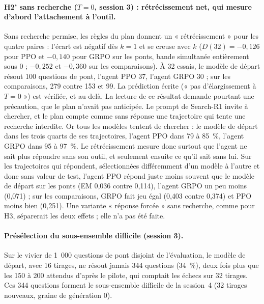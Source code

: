 \documentclass[11pt,a4paper]{article}
\begin{document}
\paragraph{H2' sans recherche ($T = 0$, session 3) : rétrécissement net, qui mesure d'abord l'attachement à l'outil.} Sans recherche permise, les règles du plan donnent un « rétrécissement » pour les quatre paires : l'écart est négatif dès $k = 1$ et se creuse avec $k$ ($D(32) = -0{,}126$ pour PPO et $-0{,}140$ pour GRPO sur les ponts, bande simultanée entièrement sous 0 ; $-0{,}252$ et $-0{,}360$ sur les comparaisons). À 32 essais, le modèle de départ résout 100 questions de pont, l'agent PPO 37, l'agent GRPO 30 ; sur les comparaisons, 279 contre 153 et 99. La prédiction écrite (« pas d'élargissement à $T = 0$ ») est vérifiée, et au-delà. La lecture de ce résultat demande pourtant une précaution, que le plan n'avait pas anticipée. Le prompt de Search-R1 invite à chercher, et le plan compte comme sans réponse une trajectoire qui tente une recherche interdite. Or tous les modèles tentent de chercher : le modèle de départ dans les trois quarts de ses trajectoires, l'agent PPO dans 79 à 85~\%, l'agent GRPO dans 95 à 97~\%. Le rétrécissement mesure donc surtout que l'agent ne sait plus répondre sans son outil, et seulement ensuite ce qu'il sait sans lui. Sur les trajectoires qui répondent, sélectionnées différemment d'un modèle à l'autre et donc sans valeur de test, l'agent PPO répond juste moins souvent que le modèle de départ sur les ponts (EM 0,036 contre 0,114), l'agent GRPO un peu moins (0,071) ; sur les comparaisons, GRPO fait jeu égal (0,403 contre 0,374) et PPO moins bien (0,251). Une variante « réponse forcée » sans recherche, comme pour H3, séparerait les deux effets ; elle n'a pas été faite.

\paragraph{Présélection du sous-ensemble difficile (session 3).} Sur le vivier de 1~000 questions de pont disjoint de l'évaluation, le modèle de départ, avec 16 tirages, ne résout jamais 344 questions (34~\%), deux fois plus que les 150 à 200 attendus d'après le pilote, qui comptait les échecs sur 32 tirages. Ces 344 questions forment le sous-ensemble difficile de la session~4 (32 tirages nouveaux, graine de génération 0).
\end{document}
